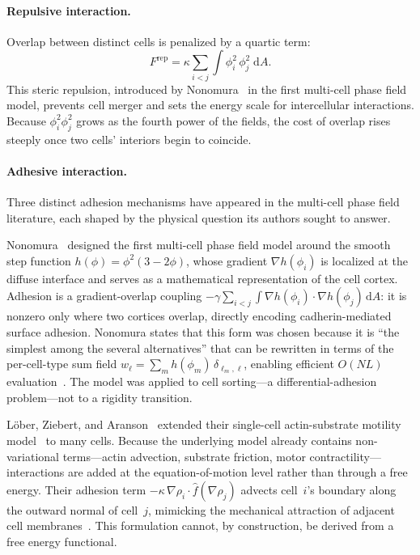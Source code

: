 \documentclass[aps,pre,twocolumn,superscriptaddress,longbibliography]{revtex4-2}
\newcommand{\dd}{\mathrm{d}}               %
\newcommand{\phii}{\phi_i}                 %
\newcommand{\phij}{\phi_j}                 %
\begin{document}
\paragraph{Repulsive interaction.}
Overlap between distinct cells is penalized by a quartic term:
%
\begin{equation}
  F^{\mathrm{rep}} = \kappa \sum_{i<j} \int \phii^2\,\phij^2\;\dd A.
  \label{eq:repulsion}
\end{equation}
%
This steric repulsion, introduced by Nonomura~\cite{Nonomura2012} in the
first multi-cell phase field model, prevents cell merger and sets the energy
scale for intercellular interactions.  Because $\phii^2\phij^2$ grows as the
fourth power of the fields, the cost of overlap rises steeply once two cells'
interiors begin to coincide.

\paragraph{Adhesive interaction.}
Three distinct adhesion mechanisms have appeared in the multi-cell phase
field literature, each shaped by the physical question its authors sought
to answer.

Nonomura~\cite{Nonomura2012} designed the first multi-cell phase field
model around the smooth step function $h(\phi) = \phi^2(3 - 2\phi)$, whose
gradient $\nabla h(\phii)$ is localized at the diffuse interface and
serves as a mathematical representation of the cell cortex.
Adhesion is a gradient-overlap coupling
$-\gamma\sum_{i<j}\!\int\!\nabla h(\phii)\!\cdot\!\nabla h(\phij)\,\dd A$:
it is nonzero only where two cortices overlap, directly encoding
cadherin-mediated surface adhesion.  Nonomura states that this form was
chosen because it is ``the simplest among the several alternatives'' that
can be rewritten in terms of the per-cell-type sum field
$w_\ell = \sum_m h(\phi_m)\,\delta_{\ell_m,\ell}$, enabling efficient
$O(NL)$ evaluation~\cite{Nonomura2012}.  The model was applied
to cell sorting---a differential-adhesion problem---not to a rigidity
transition.

L\"ober, Ziebert, and Aranson~\cite{Lober2015} extended their single-cell
actin-substrate motility model~\cite{Ziebert2012} to many cells.  Because
the underlying model already contains non-variational terms---actin
advection, substrate friction, motor contractility---interactions are added
at the equation-of-motion level rather than through a free energy.  Their
adhesion term
$-\kappa\,\nabla\rho_i \!\cdot\! \hat{f}(\nabla\rho_j)$
advects cell~$i$'s boundary along the outward normal of cell~$j$, mimicking
the mechanical attraction of adjacent cell membranes~\cite{Lober2015}.
This formulation cannot, by construction, be derived from a free energy
functional.
\end{document}
